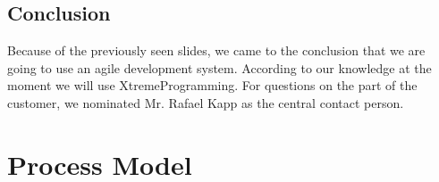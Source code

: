 \documentclass[11pt,a4paper]{scrreprt}
\begin{document}
\subsection{Conclusion}
Because of the previously seen slides, we came to the conclusion that we are going to use an agile development system. According to our knowledge at the moment we will use XtremeProgramming. For questions on the part of the customer, we nominated Mr. Rafael Kapp as the central contact person.
\section{Process Model}

\end{document}
